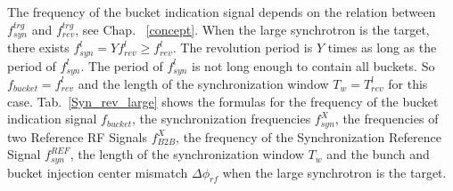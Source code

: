 The frequency of the bucket indication signal depends on the relation between $f_{\mathit{syn}}^{\mathit{trg}}$ and $f_{\mathit{rev}}^{\mathit{trg}}$, see Chap. ~\ref{concept}.
%
When the large synchrotron is the target, there exists $f_{\mathit{syn}}^{l}=Yf_{\mathit{rev}}^{l}\ge f_{\mathit{rev}}^{l}$. The revolution period is $Y$ times as long as the period of $f_{\mathit{syn}}^{l}$. The period of $f_{\mathit{syn}}^{l}$ is not long enough to contain all buckets. So $f_\mathit{bucket}=f_{\mathit{rev}}^{l}$ and the length of the synchronization window $T_w=T_{\mathit{rev}}^{l}$ for this case. Tab.~\ref{Syn_rev_large} shows the formulas for the frequency of the bucket indication signal $f_\mathit{bucket}$, the synchronization frequencies $f_\mathit{syn}^\mathit{X}$, the frequencies of two Reference RF Signals $f_\mathit{B2B}^\mathit{X}$, the frequency of the Synchronization Reference Signal $f_\mathit{syn}^\mathit{REF}$, the length of the synchronization window $T_w$ and the bunch and bucket injection center mismatch $\Delta \phi_\mathit{rf}$ when the large synchrotron is the target. 

